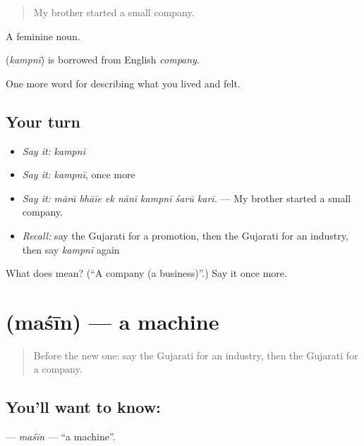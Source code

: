 \begin{quote}
My brother started a small company.
\end{quote}

A feminine noun.

\begin{cousinweb}
\textbf{} (\emph{kampnī}) is borrowed from English \emph{company}.
\end{cousinweb}

\begin{grammarlens}[title={What you've built}]
One more word for describing what you lived and felt.
\end{grammarlens}

\subsection*{Your turn}
\begin{itemize}
\raggedright
  \item \emph{Say it:} \emph{kampnī}
  \item \emph{Say it:} \emph{kampnī}, once more
  \item \emph{Say it:} \emph{mārā bhāīe ek nānī kampnī śarū karī.} — My brother started a small company.
  \item \emph{Recall:} say the Gujarati for a promotion, then the Gujarati for an industry, then say \emph{kampnī} again
\end{itemize}

\begin{tcolorbox}[breakable,colback=teal!4,colframe=teal!35!black,title={Before you move on}]
What does  mean? (\textquotedblleft{}A company (a business)\textquotedblright{}.) Say it once more.
\end{tcolorbox}
\section[\texorpdfstring{\gu{મશીન} (maśīn)}{મશીન (maśīn)}]{ (maśīn) — a machine}

\label{lesson:GU-C513-masin}



\begin{quote}
Before the new one: say the Gujarati for an industry, then the Gujarati for a company.
\end{quote}

\subsection*{You'll want to know: }
\textbf{} — \emph{maśīn} — \textquotedblleft{}a machine\textquotedblright{}.

